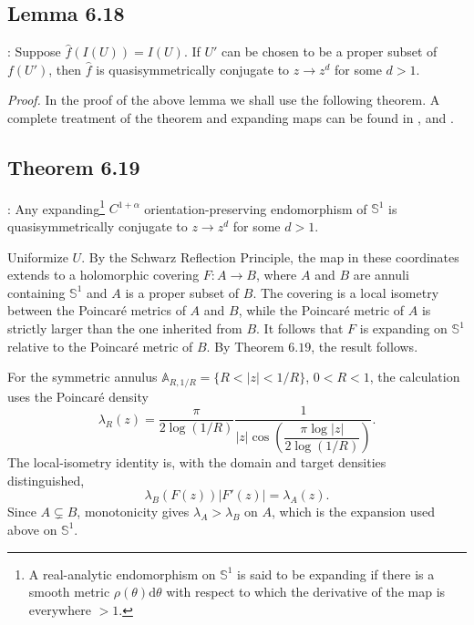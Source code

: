 \documentclass[11pt,a4paper]{article}
\begin{document}
    \subsection*{Lemma 6.18}: Suppose $\hat{f}(I(U)) = I(U)$. If $U'$ can be chosen to be a proper subset of $f(U')$, then $\hat{f}$ is quasisymmetrically conjugate to $z\rightarrow z^d$ for some $d>1$.


    \textit{Proof.} In the proof of the above lemma we shall use the following theorem. A complete treatment of the theorem and expanding maps can be found in \cite{shub1985expanding}, \cite{hubbard1982iteration} and \cite{de2012one}.
    \subsection*{Theorem 6.19}: Any expanding\footnote{A real-analytic endomorphism on $\mathbb{S}^1$ is said to be expanding if there is a smooth metric $\rho(\theta)\text{d}\theta$ with respect to which the derivative of the map is everywhere $>1$.} $C^{1+\alpha}$ orientation-preserving endomorphism of $\mathbb{S}^1$ is quasisymmetrically conjugate to $z\rightarrow z^d$ for some $d>1$.


    Uniformize $U$. By the Schwarz Reflection Principle, the map in these coordinates extends to a holomorphic covering $F:A\rightarrow B$, where $A$ and $B$ are annuli containing $\mathbb{S}^1$ and $A$ is a proper subset of $B$. The covering is a local isometry between the Poincar\'e metrics of $A$ and $B$, while the Poincar\'e metric of $A$ is strictly larger than the one inherited from $B$. It follows that $F$ is expanding on $\mathbb{S}^1$ relative to the Poincar\'e metric of $B$. By Theorem $6.19$, the result follows.

    For the symmetric annulus $\mathbb A_{R,1/R}=\{R<|z|<1/R\}$, $0<R<1$, the calculation uses the Poincar\'e density
    \[
    \lambda_R(z)=\frac{\pi}{2\log(1/R)}
    \frac{1}{|z|\cos\!\left(\dfrac{\pi\log|z|}{2\log(1/R)}\right)}.
    \]
    The local-isometry identity is, with the domain and target densities distinguished,
    \[
    \lambda_B(F(z))|F'(z)|=\lambda_A(z).
    \]
    Since $A\subsetneq B$, monotonicity gives $\lambda_A>\lambda_B$ on $A$, which is the expansion used above on $\mathbb S^1$.

\end{document}

